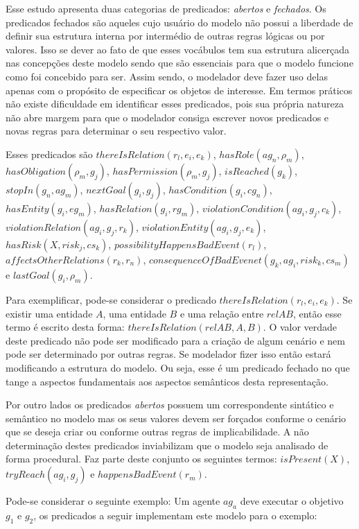 Esse estudo apresenta duas categorias de predicados: \textit{abertos} e \textit{fechados}. Os predicados fechados são aqueles cujo usuário do modelo não possui a liberdade de definir sua estrutura interna por intermédio de outras regras lógicas ou por valores. Isso se dever ao fato de que esses vocábulos tem sua estrutura alicerçada nas concepções deste modelo sendo que são essenciais para que o modelo funcione como foi concebido para ser. Assim sendo, o modelador deve fazer uso delas apenas com o propósito de especificar os objetos de interesse. Em termos práticos não existe dificuldade em identificar esses predicados, pois sua própria natureza não abre margem para que o modelador consiga escrever novos predicados e novas regras para determinar o seu respectivo valor. 

Esses predicados são $thereIsRelation(r_l,e_i,e_k)$, $hasRole(ag_n,\rho_m)$, $hasObligation(\rho_m,g_j)$,
$hasPermission(\rho_m, g_j)$, $isReached(g_k)$, $stopIn(g_n, ag_m)$, $nextGoal(g_i,g_j)$, $hasCondition(g_i,cg_n)$,
$hasEntity(g_i,eg_m)$, $hasRelation(g_i,rg_m)$, $violationCondition(ag_i,g_j,c_k) $, $ violationRelation(ag_i,g_j,r_k) $,
$ violationEntity(ag_i,g_j,e_k) $,  $ hasRisk(X, risk_j, cs_k) $, $possibilityHappensBadEvent(r_l)$, 
$affectsOtherRelations(r_k,r_n)$, $consequenceOfBadEvenet(g_k, ag_i,risk_k,cs_m)$  e $lastGoal(g_i,\rho_m)$. 


Para exemplificar, pode-se considerar o predicado $thereIsRelation(r_l,e_i,e_k)$. Se existir uma entidade $A$, uma entidade $B$ e uma relação entre $relAB$, então esse termo é escrito desta forma: $thereIsRelation(relAB,A,B)$. O valor verdade deste predicado não pode ser modificado para a criação de algum cenário e nem pode ser determinado por outras regras. Se modelador fizer isso então estará modificando a estrutura do modelo. Ou seja, esse é um predicado fechado no que tange a aspectos fundamentais aos aspectos semânticos desta representação. 

Por outro lados os predicados \textit{abertos} possuem um correspondente sintático e semântico no modelo mas os seus valores devem ser forçados conforme o cenário que se deseja criar ou conforme outras regras de implicabilidade. A não determinação destes predicados inviabilizam que o modelo seja analisado de forma procedural. Faz parte deste conjunto os seguintes termos: $isPresent(X)$,$tryReach(ag_i,g_j)$ e $happensBadEvent(r_m)$.

Pode-se considerar o seguinte exemplo: Um agente $ag_a$ deve executar o objetivo $g_1$ e $g_2$, os predicados a seguir implementam este modelo para o exemplo:

